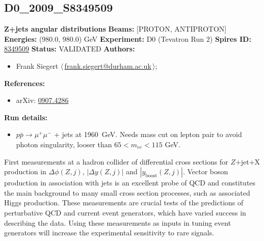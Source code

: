 \subsection[D0\_2009\_S8349509]{D0\_2009\_S8349509\,\cite{Abazov:2009pp}}
\textbf{Z+jets angular distributions}\newline
\textbf{Beams:} [PROTON, ANTIPROTON] \newline
\textbf{Energies:} (980.0, 980.0) GeV \newline
\textbf{Experiment:} D0 (Tevatron Run 2) \newline
\textbf{Spires ID:} \href{http://www.slac.stanford.edu/spires/find/hep/www?rawcmd=key+8349509}{8349509}\newline
\textbf{Status:} VALIDATED\newline
\textbf{Authors:}
\begin{itemize}
  \item Frank Siegert $\langle\,$\href{mailto:frank.siegert@durham.ac.uk}{frank.siegert@durham.ac.uk}$\,\rangle$;
\end{itemize}
\textbf{References:}
\begin{itemize}
  \item arXiv: \href{http://arxiv.org/abs/0907.4286}{0907.4286}
\end{itemize}
\textbf{Run details:}
\begin{itemize}

  \item $p \bar{p} \to \mu^+ \mu^-$ + jets at 1960~GeV. Needs mass cut on lepton pair to avoid photon singularity, looser than $65 < m_{ee} < 115$ GeV.\end{itemize}

\noindent First measurements at a hadron collider of differential cross sections for $Z$+jet+X production in $\Delta\phi(Z, j)$, $|\Delta y(Z, j)|$ and $|y_\mathrm{boost}(Z, j)|$. Vector boson production in association with jets is an excellent probe of QCD and constitutes the main background to many small cross section processes, such as associated Higgs production. These measurements are crucial tests of the predictions of perturbative QCD and current event generators, which have varied success in describing the data. Using these measurements as inputs in tuning event generators will increase the experimental sensitivity to rare signals.

\clearpage


\clearpage

